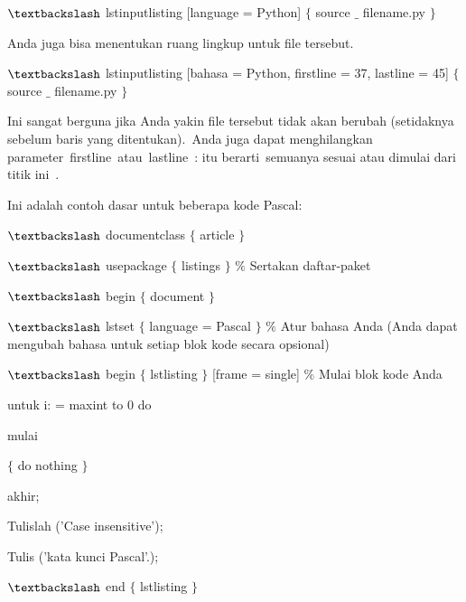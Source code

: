 $\textbackslash$ lstinputlisting [language = Python] $ \{ $ source $ \_ $ filename.py $ \} $\par

Anda juga bisa menentukan ruang lingkup untuk file tersebut.\par

$\textbackslash$ lstinputlisting [bahasa = Python, firstline = 37, lastline = 45] $ \{ $ source $ \_ $ filename.py $ \} $\par

Ini sangat berguna jika Anda yakin file tersebut tidak akan berubah (setidaknya sebelum baris yang ditentukan). Anda juga dapat menghilangkan parameter firstline atau lastline : itu berarti semuanya sesuai atau dimulai dari titik ini .\par

Ini adalah contoh dasar untuk beberapa kode Pascal:\par

 $\textbackslash$ documentclass $ \{ $ article $ \} $\par

 $\textbackslash$ usepackage $ \{ $ listings $ \} $ $\%$ Sertakan daftar-paket\par

 $\textbackslash$ begin $ \{ $ document $ \} $\par

 $\textbackslash$ lstset $ \{ $ language = Pascal $ \} $ $\%$ Atur bahasa Anda (Anda dapat mengubah bahasa untuk setiap blok kode secara opsional)\par

 $\textbackslash$ begin $ \{ $ lstlisting $ \} $ [frame = single] $\%$ Mulai blok kode Anda\par

 untuk i: = maxint to 0 do\par

 mulai\par

 $ \{ $ do nothing $ \} $\par

 akhir;\par

 Tulislah ('Case insensitive');\par

 Tulis ('kata kunci Pascal'.);\par

 $\textbackslash$ end $ \{ $ lstlisting $ \} $\par

